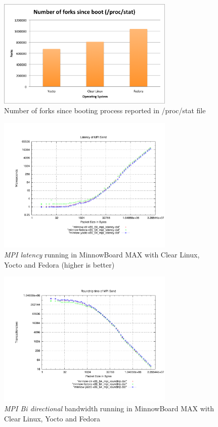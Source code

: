 \begin{figure}[H]
\centering
\includegraphics[width=0.75\textwidth]{images/number_forks_yocto.png}
\caption{Number of forks since booting process reported in /proc/stat file }
\label{number_forks_yocto}
\end{figure}

\begin{figure}[H]
\centering
\includegraphics[width=0.75\textwidth]{images/mpbench_yocto_experiments/mpi_latency.pdf}
\caption{\textit{MPI latency} running in  MinnowBoard MAX  with Clear Linux,
Yocto and Fedora (higher is better)}
\label{mpi_latency_yocto}
\end{figure}


\begin{figure}[H]
\centering
\includegraphics[width=0.75\textwidth]{images/mpbench_yocto_experiments/mpi_roundtrip.pdf}
\caption{\textit{MPI Bi directional} bandwidth running in  MinnowBoard MAX  with Clear Linux,
Yocto and Fedora }
\label{mpi_roundtrip_yocto}
\end{figure}

